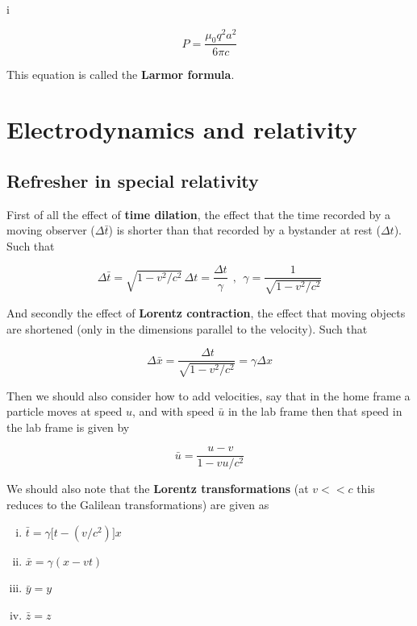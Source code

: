 i\documentclass[a4paper]{article}
\begin{document}
\begin{equation*}
    P=\frac{\mu_0q^2a^2}{6\pi c}
\end{equation*}

This equation is called the \textbf{Larmor formula}.

\section{Electrodynamics and relativity}

\subsection{Refresher in special relativity}

First of all the effect of \textbf{time dilation}, the effect that the time recorded by a moving observer ($\Delta\bar{t}$) is shorter than that recorded by a bystander at rest ($\Delta t$). Such that

\begin{equation*}
    \Delta\bar{t}=\sqrt{1-v^2/c^2}\,\Delta t=\frac{\Delta t}{\gamma}\ \ ,\ \ \gamma=\frac{1}{\sqrt{1-v^2/c^2}}
\end{equation*}

And secondly the effect of \textbf{Lorentz contraction}, the effect that moving objects are shortened (only in the dimensions parallel to the velocity). Such that

\begin{equation*}
    \Delta\bar{x}=\frac{\,\Delta t}{\sqrt{1-v^2/c^2}}=\gamma\Delta x
\end{equation*}

Then we should also consider how to add velocities, say that in the home frame a particle moves at speed $u$, and with speed $\bar{u}$ in the lab frame then that speed in the lab frame is given by

\begin{equation*}
    \bar{u}=\frac{u-v}{1-vu/c^2}
\end{equation*}

We should also note that the \textbf{Lorentz transformations} (at $v<<c$ this reduces to the Galilean transformations) are given as

\begin{enumerate}[(i)]
    \item $\bar{t}=\gamma\big[t-(v/c^2)\big]x$
    \item $\bar{x}=\gamma(x-vt)$
    \item $\bar{y}=y$
    \item $\bar{z}=z$
\end{enumerate}
\end{document}
